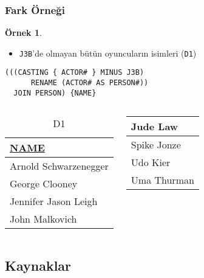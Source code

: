 \documentclass[dvipsnames]{beamer}
\theoremstyle{definition}
\theoremstyle{example}
\newtheorem{ornek}[theorem]{Örnek}
\theoremstyle{plain}
\begin{document}
\begin{frame}[fragile]
  \frametitle{Fark Örneği}

  \begin{ornek}
    \begin{itemize}
      \item \texttt{J3B}'de olmayan bütün oyuncuların isimleri (\texttt{D1})
    \end{itemize}

    \begin{lstlisting}
(((CASTING { ACTOR# } MINUS J3B)
      RENAME (ACTOR# AS PERSON#))
  JOIN PERSON) {NAME}
    \end{lstlisting}

    \pause
    \vspace{-10pt}
    \begin{columns}[b]
      \begin{tiny}
      \begin{table}
        \caption{D1}
        \begin{tabular}{|l|}\hline
\underline{NAME}     \\[2pt]\hline\hline
Arnold Schwarzenegger\\\hline
George Clooney       \\\hline
Jennifer Jason Leigh \\\hline
John Malkovich       \\\hline
        \end{tabular}
      \end{table}
      \end{tiny}

      \begin{tiny}
      \begin{table}
        \begin{tabular}{|l|}\hline
Jude Law             \\\hline
Spike Jonze          \\\hline
Udo Kier             \\\hline
Uma Thurman          \\\hline
        \end{tabular}
      \end{table}
      \end{tiny}
    \end{columns}
  \end{ornek}
\end{frame}

\subsection*{Kaynaklar}
\end{document}
